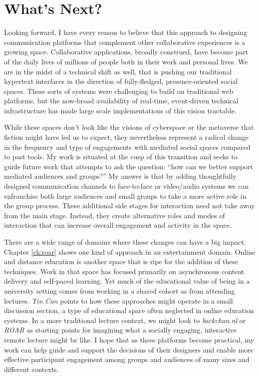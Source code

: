 

\section{What's Next?}
Looking forward, I have every reason to believe that this approach to designing communication platforms that complement other collaborative experiences is a growing space. Collaborative applications, broadly construed, have become part of the daily lives of millions of people both in their work and personal lives. We are in the midst of a technical shift as well, that is pushing our traditional hypertext interfaces in the direction of fully-fledged, presence-oriented social spaces. These sorts of systems were challenging to build on traditional web platforms, but the now-broad availability of real-time, event-driven technical infrastructure has made large scale implementations of this vision tractable.

While these spaces don't look like the visions of cyberspace or the metaverse that fiction might have led us to expect, they nevertheless represent a radical change in the frequency and type of engagements with mediated social spaces compared to past tools. My work is situated at the cusp of this transition and seeks to guide future work that attempts to ask the question: ``how can we better support mediated audiences and groups?'' My answer is that by adding thoughtfully designed communication channels to face-to-face or video/audio systems we can enfranchise both large audiences and small groups to take a more active role in the group process. These additional side stages for interaction need not take away from the main stage. Instead, they create alternative roles and modes of interaction that can increase overall engagement and activity in the space.

There are a wide range of domains where these changes can have a big impact. Chapter \ref{ch:roar} shows one kind of approach in an entertainment domain. Online and distance education is another space that is ripe for the addition of these techniques. Work in that space has focused primarily on asynchronous content delivery and self-paced learning. Yet much of the educational value of being in a university setting comes from working in a shared cohort as from attending lectures. \emph{Tin Can} points to how these approaches might operate in a small discussion section, a type of educational space often neglected in online education systems. In a more traditional lecture context, we might look to  \emph{backchan.nl} or \emph{ROAR} as starting points for imagining what a socially engaging, interactive remote lecture might be like. I hope that as these platforms become practical, my work can help guide and support the decisions of their designers and enable more effective participant engagement among groups and audiences of many sizes and different contexts.



